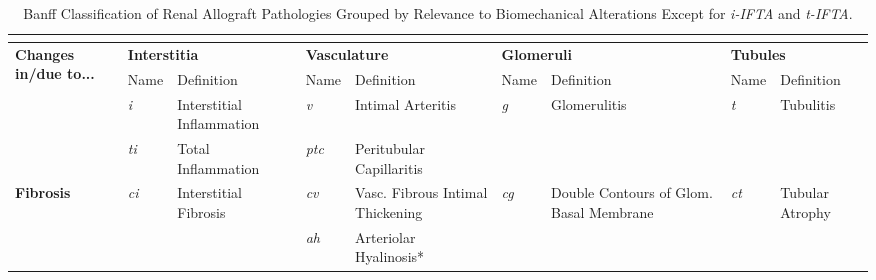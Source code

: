 
\begin{landscape}
    \singlespacing
    \begin{longtable}{
        p{1.00in} 
        p{0.30in} p{1.05in} 
        p{0.30in} p{1.20in} 
        p{0.30in} p{1.20in} 
        p{0.30in} p{1.05in}}
        \caption{Banff Classification of Renal Allograft Pathologies Grouped by Relevance to Biomechanical Alterations Except for \emph{i-IFTA} and \emph{t-IFTA}.}\\
        \label{tbl:banff}\\
        \toprule
        \multirow{2}{=}{\textbf{Changes in/due to...}} & 
        \multicolumn{2}{l}{\textbf{Interstitia}} & 
        \multicolumn{2}{l}{\textbf{Vasculature}} & 
        \multicolumn{2}{l}{\textbf{Glomeruli}} & 
        \multicolumn{2}{l}{\textbf{Tubules}} \\
            & 
        Name & 
        Definition & 
        Name & 
        Definition & 
        Name & 
        Definition & 
        Name & 
        Definition \\
        \midrule
        \endfirsthead
        \endhead
        \endlastfoot
        \multirow[t]{2}{=}{\textbf{Inflammation}} & 
        \textit{i} & 
        Interstitial \mbox{Inflammation} & 
        \textit{v} & 
        Intimal Arteritis & 
        \multirow[t]{2}{=}{\textit{g}} & 
        \multirow[t]{2}{*}{Glomerulitis} & 
        \multirow[t]{2}{=}{\textit{t}} & 
        \multirow[t]{2}{*}{Tubulitis} \\
            & 
        \textit{ti} & 
        Total \mbox{Inflammation} & 
        \textit{ptc} & 
        Peritubular \mbox{Capillaritis} &
            & 
            & 
            & 
            \\
        \hline
        \multirow[t]{3}{=}{\textbf{Fibrosis}} & 
        \multirow[t]{3}{=}{\textit{ci}} & 
        \multirow[t]{3}{=}{Interstitial Fibrosis} & 
        \textit{cv} & 
        Vasc. Fibrous Intimal Thickening & 
        \multirow[t]{3}{=}{\textit{cg}} & 
        \multirow[t]{3}{=}{Double Contours of Glom. Basal Membrane} & 
        \multirow[t]{3}{=}{\textit{ct}} & 
        \multirow[t]{3}{=}{Tubular Atrophy} \\
            & 
            & 
            & 
        \textit{ah} & 
        Arteriolar \mbox{Hyalinosis*} & 

\end{longtable}
\end{landscape}
